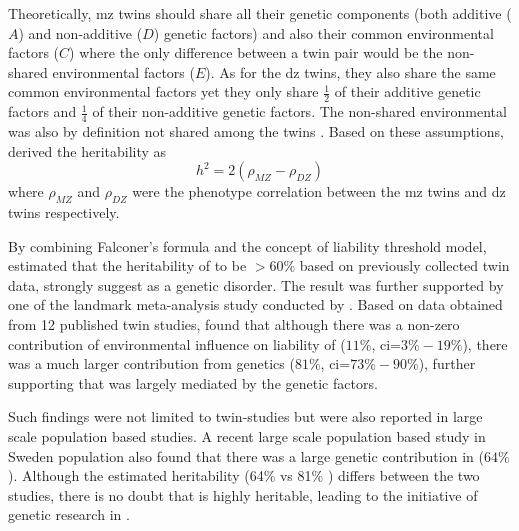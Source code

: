 	Theoretically, \gls{mz} twins should share all their genetic components (both additive ($A$) and non-additive ($D$) genetic factors) and also their common environmental factors ($C$) where the only difference between a twin pair would be the non-shared environmental factors ($E$). 
	As for the \gls{dz} twins, they also share the same common environmental factors yet they only share $\frac{1}{2}$ of their additive genetic factors and $\frac{1}{4}$ of their non-additive genetic factors. 
	The non-shared environmental was also by definition not shared among the twins \citep{Rijsdijk2002}.
	Based on these assumptions, \cite{Falconer1996} derived the heritability as
	\begin{equation}
	h^2 = 2(\rho_{MZ}-\rho_{DZ})
	\end{equation}
	where $\rho_{MZ}$ and $\rho_{DZ}$ were the phenotype correlation between the \gls{mz} twins and \gls{dz} twins respectively.
	
	By combining Falconer's formula and the concept of liability threshold model, \citet{Gottesman01071967} estimated that the heritability of  to be $>60\%$ based on previously collected twin data, strongly suggest  as a genetic disorder.
	The result was further supported by one of the landmark meta-analysis study conducted by \citet{Sullivan2003}.
	Based on data obtained from 12 published  twin studies, \citet{Sullivan2003} found that although there was a non-zero contribution of environmental influence on liability of  ($11\%$, \gls{ci}=$3\%-19\%$), there was a much larger contribution from genetics ($81\%$, \gls{ci}=$73\%-90\%$), further supporting that  was largely mediated by the genetic factors.
	
	Such findings were not limited to twin-studies but were also reported in large scale population based studies.
	A recent large scale population based study in Sweden population \citep{Lichtenstein2009} also found that there was a large genetic contribution in  ($64\%$).
	Although the estimated heritability (64\% \citep{Lichtenstein2009} vs 81\% \citep{Sullivan2003}) differs between the two studies, there is no doubt that  is highly heritable, leading to the initiative of genetic research in .
	
